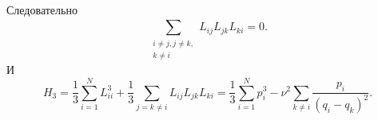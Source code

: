 \documentclass[a4paper]{article}
\begin{document}
\begin{sol}
Следовательно
\[
\sum_{\substack{i\neq j, j\neq k,\\ k\neq i}}^{} L_{ij}L_{jk}L_{ki}=0
.\] 
И
\[
H_3= \frac{1}{3} \sum_{i=1}^{N} L_{ii}^3+ \frac{1}{3}
\sum_{j=k\neq i}^{} L_{ij}L_{jk}L_{ki}=
\frac{1}{3}\sum_{i=1}^{N} p_i^3-
\nu^2 \sum_{k \neq i}^{} \frac{p_i}{(q_i-q_k)^2}
.\] 

\end{sol}
\begin{hiProb}[Упражнение 1.3]
\end{hiProb}
\end{document}
